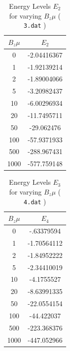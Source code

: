 \documentclass[a4paper]{IEEEtran}
\begin{document}
    \begin{table} 
        \caption{Energy Levels $E_2$ for varying $B_z\mu$ ( \texttt{3.dat} )}
        \label{tbl:energy-3} 
        \begin{center}
        \begin{tabular}{|c|c|} \hline
        $B_z\mu$ & $E_2$ \\ \hline \hline
        0    & -2.04416367 \\ \hline
        1    & -1.92139214\\ \hline
        2    & -1.89004066 \\ \hline
        5    & -3.20982437 \\ \hline
        10   & -6.00296934 \\ \hline
        20   & -11.7495711\\ \hline
        50   & -29.062476 \\ \hline
        100  & -57.9371933  \\ \hline
        500  & -288.967431  \\ \hline
        1000 & -577.759148 \\ \hline
        \end{tabular}
        \end{center}
    \end{table} 

    \begin{table} 
        \caption{Energy Levels $E_3$ for varying $B_z\mu$ ( \texttt{4.dat} )}
        \label{tbl:energy-4} 
        \begin{center}
        \begin{tabular}{|c|c|}  \hline
        $B_z\mu$ & $E_4$  \\ \hline \hline
        0    & -.63379594 \\ \hline
        1    &  -1.70564112 \\ \hline
        2    &  -1.84952222\\ \hline
        5    &  -2.34410019 \\ \hline
        10   &  -4.1755527 \\ \hline
        20   &  -8.63991335 \\ \hline
        50   &  -22.0554154 \\ \hline
        100  &  -44.422037 \\ \hline
        500  &  -223.368376 \\ \hline
        1000 &  -447.052966 \\ \hline
        \end{tabular}
        \end{center}
    \end{table} 
\end{document}
